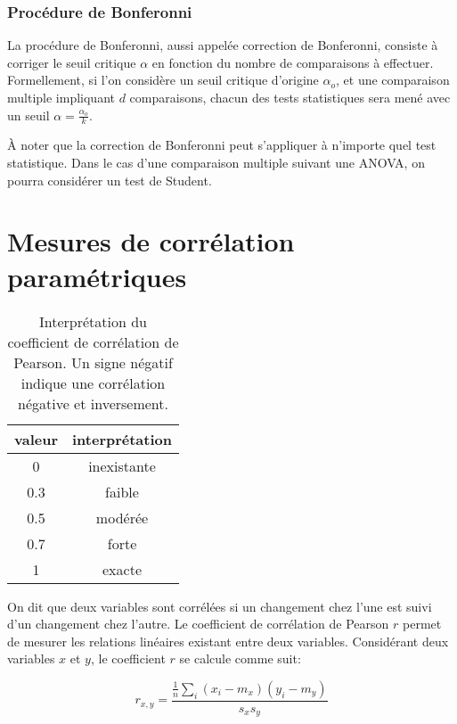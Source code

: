 \subsubsection*{Procédure de Bonferonni}
\label{app:bonferonni}

La procédure de Bonferonni, aussi appelée correction de Bonferonni, consiste à corriger le seuil critique $\alpha$ en fonction du nombre de comparaisons à effectuer. Formellement, si l'on considère un seuil critique d'origine $\alpha_{o}$, et une comparaison multiple impliquant $d$ comparaisons, chacun des tests statistiques sera mené avec un seuil $\alpha=\frac{\alpha_{o}}{k}$. 

À noter que la correction de Bonferonni peut s'appliquer à n'importe quel test statistique. Dans le cas d'une comparaison multiple suivant une ANOVA, on pourra considérer un test de Student.

\section{Mesures de corrélation paramétriques}
\label{app:corr}

\begin{table}[t]
\centering
\begin{tabular}{c c }  
valeur & interprétation  \\      
\hline
0   & inexistante \\
0.3 & faible \\
0.5 & modérée \\
0.7 & forte \\
1   & exacte \\
\hline
\end{tabular}
\vspace{0.5mm}
\caption[Interprétation du coefficient de corrélation de Pearson.]{Interprétation du coefficient de corrélation de Pearson. Un signe négatif indique une corrélation négative et inversement.}
\label{tab:coefPearson}
\end{table}

On dit que deux variables sont corrélées si un changement chez l'une est suivi d'un changement chez l'autre. Le coefficient de corrélation de Pearson $r$ permet de mesurer les relations linéaires existant entre deux variables. Considérant deux variables $x$ et $y$, le coefficient $r$ se calcule comme suit:

\begin{equation}
r_{x,y}=\dfrac{\frac{1}{n}\sum\limits_i(x_i - m_x)(y_i-m_y)}{s_x s_y}
\end{equation}

